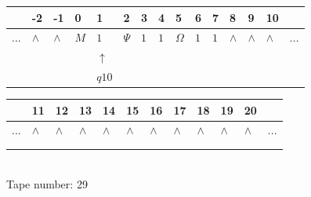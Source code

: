 \documentclass[11pt]{article}
\begin{document}
\begin{table}[H]
\centering
\begin{tabular}{lllllllllllllll}
 & -2 & -1 & 0 & 1 & 2 & 3 & 4 & 5 & 6 & 7 & 8 & 9 & 10 & \\
\hline
$...$ & \multicolumn{1}{|l|}{$\wedge$} & \multicolumn{1}{|l|}{$\wedge$} & \multicolumn{1}{|l|}{$M$} & \multicolumn{1}{|l|}{$1$} & \multicolumn{1}{|l|}{$\Psi$} & \multicolumn{1}{|l|}{$1$} & \multicolumn{1}{|l|}{$1$} & \multicolumn{1}{|l|}{$\Omega$} & \multicolumn{1}{|l|}{$1$} & \multicolumn{1}{|l|}{$1$} & \multicolumn{1}{|l|}{$\wedge$} & \multicolumn{1}{|l|}{$\wedge$} & \multicolumn{1}{|l|}{$\wedge$} & $...$\\
\hline
&  &  &  & $\uparrow$ &  &  &  &  &  &  &  &  &  &  \\
&  &  &  & $ q10 $ &  &  &  &  &  &  &  &  &  &  \\
\end{tabular}
\begin{tabular}{llllllllllll}
 & 11 & 12 & 13 & 14 & 15 & 16 & 17 & 18 & 19 & 20 & \\
\hline
$...$ & \multicolumn{1}{|l|}{$\wedge$} & \multicolumn{1}{|l|}{$\wedge$} & \multicolumn{1}{|l|}{$\wedge$} & \multicolumn{1}{|l|}{$\wedge$} & \multicolumn{1}{|l|}{$\wedge$} & \multicolumn{1}{|l|}{$\wedge$} & \multicolumn{1}{|l|}{$\wedge$} & \multicolumn{1}{|l|}{$\wedge$} & \multicolumn{1}{|l|}{$\wedge$} & \multicolumn{1}{|l|}{$\wedge$} & $...$\\
\hline
&  &  &  &  &  &  &  &  &  &  &  \\
&  &  &  &  &  &  &  &  &  &  &  \\
\end{tabular}
\\
Tape number: 29
\noindent\makebox[\linewidth]{\hdashrule{\textwidth}{1pt}{1pt}}\end{table}
\end{document}

